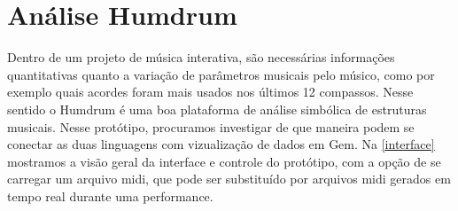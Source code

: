 \documentclass{ppgmus}
\begin{document}
% 
% 
% 
% 
% 
% 


\pagebreak 



\section{Análise Humdrum}

  Dentro de um projeto de música interativa, são necessárias informações quantitativas quanto a 
variação de parâmetros musicais pelo músico, como por exemplo quais acordes foram mais usados 
nos últimos 12 compassos.
Nesse sentido o Humdrum é uma boa plataforma de análise simbólica de estruturas musicais. 
Nesse protótipo, procuramos investigar de que maneira podem se conectar as duas linguagens 
com vizualização de dados em Gem.
Na \ref{interface} mostramos a visão geral da interface e controle
do protótipo, com a opção de se carregar um arquivo midi, 
que pode ser substituído por arquivos midi gerados em tempo real 
durante uma performance.

\end{document}
